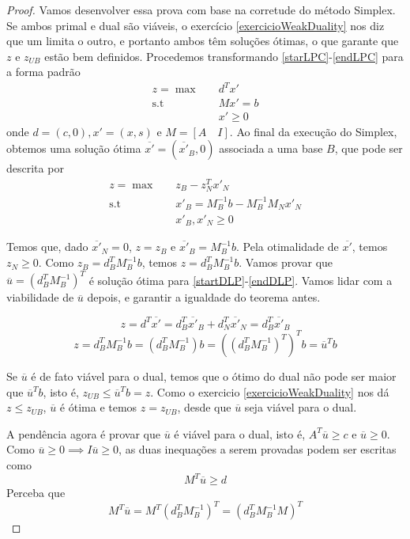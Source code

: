 \documentclass[]{article}
\numberwithin{equation}{section}
\begin{document}
\begin{proof}
  Vamos desenvolver essa prova com base na corretude do método Simplex.
  Se ambos primal e dual são viáveis, o exercício \ref{exercicioWeakDuality} nos diz que um limita o
  outro, e portanto ambos têm soluções ótimas, o que garante que $z$ e $z_{UB}$ estão bem definidos.
  Procedemos transformando \eqref{starLPC}-\eqref{endLPC} para a forma padrão
  \begin{align}
  z =   \max        &\quad  d^Tx'  \\
        \text{s.t}  &\quad  Mx' = b \\
                    &\quad  x' \geq 0
  \end{align}
  onde $d = (c, 0), x' = (x, s)$ e $M = [A \quad I]$.
  Ao final da execução do Simplex, obtemos uma solução ótima $\overline{x'} = (\overline{x'}_B, 0)$
  associada a uma base $B$, que pode ser descrita por
  \begin{align}
  z = \max        &\quad  z_B - z_N^Tx'_N                     \\
      \text{s.t}  &\quad  x'_B = M_B^{-1}b - M_B^{-1}M_Nx'_N \\
                  &\quad  x'_B, x'_N \geq 0
  \end{align}

  Temos que, dado $\overline{x'}_N = 0$, $z = z_B$ e $\overline{x'}_B = M_B^{-1}b$.
  Pela otimalidade de $\overline{x'}$, temos $z_N \geq 0$.
  Como $z_B = d_B^TM_B^{-1}b$, temos $z = d_B^TM_B^{-1}b$.
  Vamos provar que $\overline{u} = (d_B^TM_B^{-1})^T$ é solução ótima para
  \eqref{startDLP}-\eqref{endDLP}.
  Vamos lidar com a viabilidade de $\overline{u}$ depois, e garantir a igualdade do teorema antes.

  $$
  z = d^T\overline{x'} = d_B^T\overline{x'}_B + d_N^T\overline{x'}_N = d_B^T\overline{x'}_B
  $$
  $$
  z = d_B^TM_B^{-1}b = (d_B^TM_B^{-1})b = ((d_B^TM_B^{-1})^T)^Tb = \overline{u}^Tb
  $$

  Se $\overline{u}$ é de fato viável para o dual, temos que o ótimo do dual não pode ser maior que
  $\overline{u}^Tb$, isto é, $z_{UB} \leq \overline{u}^Tb = z$.
  Como o exercicio \ref{exercicioWeakDuality} nos dá $z \leq z_{UB}$, $\overline{u}$ é ótima e temos
  $z = z_{UB}$, desde que $\overline{u}$ seja viável para o dual.

  A pendência agora é provar que $\overline{u}$ é viável para o dual, isto é, $A^T\overline{u} \geq c$ e
  $\overline{u} \geq 0$.
  Como $\overline{u} \geq 0 \implies I\overline{u} \geq 0$, as duas inequações a serem provadas podem
  ser escritas como
  $$
  M^T\overline{u} \geq d
  $$
  Perceba que
  $$
  M^T\overline{u} = M^T(d_B^TM_B^{-1})^T = (d_B^TM_B^{-1}M)^T
  $$


\end{proof}
\end{document}
